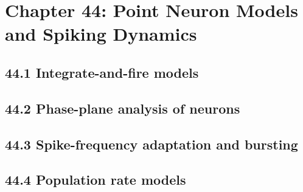 \section{Chapter 44: Point Neuron Models and Spiking Dynamics}

\subsection{44.1 Integrate-and-fire models}

\subsection{44.2 Phase-plane analysis of neurons}

\subsection{44.3 Spike-frequency adaptation and bursting}

\subsection{44.4 Population rate models}

\clearpage
